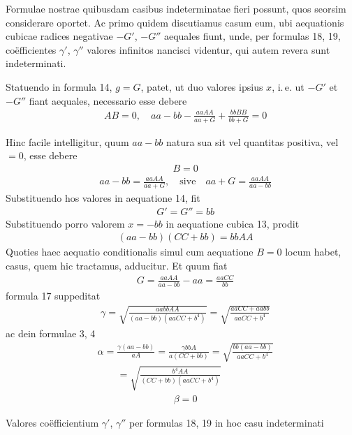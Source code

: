 
Formulae nostrae quibusdam casibus indeterminatae fieri possunt, quos
seorsim considerare oportet. Ac primo quidem discutiamus casum eum, ubi aequationis
cubicae radices negativae $-G'$, $-G''$ aequales fiunt, unde, per formulas
18, 19, coëfficientes $\gamma'$, $\gamma''$ valores infinitos nancisci videntur, qui autem
revera sunt indeterminati.

Statuendo in formula 14, $g=G$, patet, ut duo valores ipsius $x$, i.\,e. ut
$-G'$ et $-G''$ fiant aequales, necessario esse debere
\[
\begin{aligned}
&AB=0,\quad aa-bb-\frac{aaAA}{aa+G}+\frac{bbBB}{bb+G}=0
\end{aligned}
\]
\par Hinc facile intelligitur, quum $aa-bb$ natura sua sit vel quantitas positiva,
vel $=0$, esse debere
\[
\begin{aligned}
&B=0
\end{aligned}
\]
\[
\begin{aligned}
&aa-bb=\frac{aaAA}{aa+G},\quad\text{sive}\quad aa+G=\frac{aaAA}{aa-bb}
\end{aligned}
\]
Substituendo hos valores in aequatione 14, fit
\[
\begin{aligned}
&G'=G''=bb
\end{aligned}
\]
Substituendo porro valorem $x=-bb$ in aequatione cubica 13, prodit
\[
\begin{aligned}
&(aa-bb)(CC+bb)=bbAA
\end{aligned}
\]
Quoties haec aequatio conditionalis simul cum aequatione $B=0$ locum habet,
casus, quem hic tractamus, adducitur. Et quum fiat
\[
\begin{aligned}
&G=\frac{aaAA}{aa-bb}-aa=\frac{aaCC}{bb}
\end{aligned}
\]
\noindent{}
formula 17 suppeditat
\[
\begin{aligned}
&\gamma=\surd{\frac{aabbAA}{(aa-bb)(aaCC+b^4)}}
=\surd{\frac{aaCC+aabb}{aaCC+b^4}}
\end{aligned}
\]
ac dein formulae 3, 4
\[
\begin{aligned}
&\alpha=\frac{\gamma(aa-bb)}{aA}=\frac{\gamma bbA}{a(CC+bb)}
=\surd{\frac{bb(aa-bb)}{aaCC+b^4}}
\\[6pt]
&\qquad{}=\surd{\frac{b^4AA}{(CC+bb)(aaCC+b^4)}}
\end{aligned}
\]
\[
\begin{aligned}
&\beta=0
\end{aligned}
\]
\par Valores coëfficientium $\gamma'$, $\gamma''$ per formulas 18, 19 in hoc casu indeterminati
